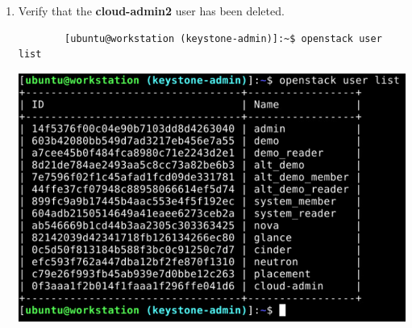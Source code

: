 \documentclass[letterpaper, 12pt]{article}
\begin{document}
\begin{enumerate}
    \item Verify that the \textbf{cloud-admin2} user has been deleted.
    \begin{lstlisting}
        [ubuntu@workstation (keystone-admin)]:~$ openstack user list
    \end{lstlisting}

    \begin{center}
        \includegraphics[width=\linewidth]{images/appendix/step11.png}
    \end{center}

\end{enumerate}
\end{document}
